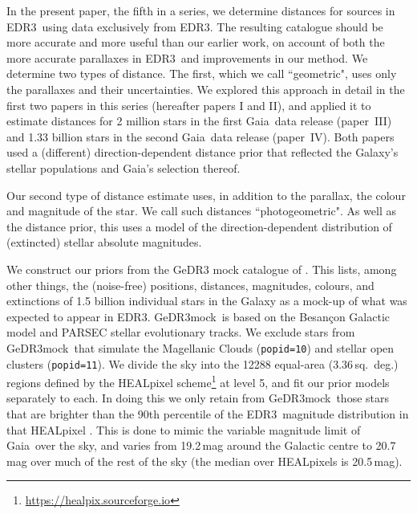 \documentclass[twocolumn]{aastex62}
\providecommand{\gaia}{Gaia}
\providecommand{\gedr}[1]{GeDR{#1}}
\providecommand{\mock}{GeDR3mock}
\providecommand{\release}{EDR3}
\begin{document}
In the present paper, the fifth in a series, we determine distances for sources in \release\ using data exclusively from \release. The resulting catalogue should be more accurate and more useful than our earlier work, on account of both the more accurate parallaxes in \release\ and improvements in our method. We determine two types of distance. The first, which we call ``geometric", uses only the parallaxes and their uncertainties.
We explored this approach in detail in the first two papers in this series \citep{2015PASP..127..994B, 2016ApJ...832..137A} (hereafter papers I and II), and applied it to estimate distances for 2 million stars in the first \gaia\ data release
\citep{2016ApJ...833..119A} (paper~III)
and 1.33 billion stars in the second \gaia\ data release
\citep{2018AJ....156...58B} (paper~IV).
Both papers used a (different) direction-dependent distance prior that reflected the Galaxy's stellar populations and \gaia's selection thereof. 

Our second type of distance estimate uses, in addition to the parallax, the colour and magnitude of the star. We call such distances ``photogeometric". As well as the distance prior, this uses a model of the direction-dependent distribution of (extincted) stellar absolute magnitudes. 

We construct our priors from the \gedr{3} mock catalogue of \cite{2020PASP..132g4501R}.
This lists, among other things, the (noise-free) positions, distances, magnitudes, colours, and extinctions of 1.5 billion individual stars in the Galaxy 
as a mock-up of what was expected to appear in \release. \mock\ is based on the Besan\c{c}on Galactic model and PARSEC stellar evolutionary tracks.
We exclude stars from \mock\ that simulate the Magellanic Clouds ({\tt popid=10}) and stellar open clusters ({\tt popid=11}).
We divide the sky into the 12288 equal-area (3.36\,sq.~deg.)
regions defined by the HEALpixel scheme\footnote{\url{https://healpix.sourceforge.io}} at level 5, and fit our prior models separately to each. In doing this we only retain from \mock\ those stars that are brighter than the 90th percentile of the \release\ magnitude distribution in that HEALpixel
\citep{2018ascl.soft11018R, gedr3_nearbystars}.
This is done to mimic the variable magnitude limit of \gaia\ over the sky, and varies from 19.2\,mag around the Galactic centre to 20.7\,mag over much of the rest of the sky (the median over HEALpixels is 20.5\,mag). 
\end{document}

